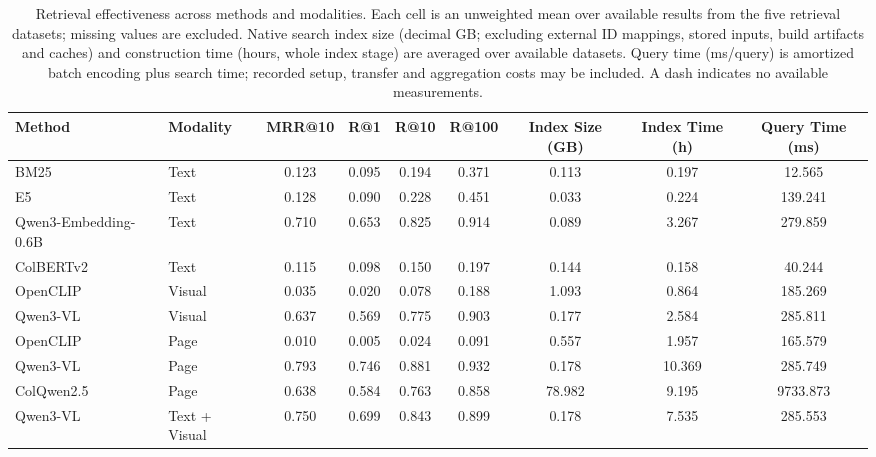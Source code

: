 \begin{table}[t]
\centering
\caption{Retrieval effectiveness across methods and modalities. Each cell is an unweighted mean over available results from the five retrieval datasets; missing values are excluded. Native search index size (decimal GB; excluding external ID mappings, stored inputs, build artifacts and caches) and construction time (hours, whole index stage) are averaged over available datasets. Query time (ms/query) is amortized batch encoding plus search time; recorded setup, transfer and aggregation costs may be included. A dash indicates no available measurements.}
\label{tab:retrieval_results}
\footnotesize
\setlength{\tabcolsep}{4pt}
\renewcommand{\arraystretch}{1.1}
\begin{tabular}{@{}llccccccc@{}}
\toprule
\textbf{Method} & \textbf{Modality} & \textbf{MRR@10} & \textbf{R@1} & \textbf{R@10} & \textbf{R@100} & \textbf{Index Size (GB)} & \textbf{Index Time (h)} & \textbf{Query Time (ms)} \\
\midrule
BM25 & Text & 0.123 & 0.095 & 0.194 & 0.371 & 0.113 & 0.197 & 12.565 \\
E5 & Text & 0.128 & 0.090 & 0.228 & 0.451 & 0.033 & 0.224 & 139.241 \\
Qwen3-Embedding-0.6B & Text & 0.710 & 0.653 & 0.825 & 0.914 & 0.089 & 3.267 & 279.859 \\
ColBERTv2 & Text & 0.115 & 0.098 & 0.150 & 0.197 & 0.144 & 0.158 & 40.244 \\
\midrule
OpenCLIP & Visual & 0.035 & 0.020 & 0.078 & 0.188 & 1.093 & 0.864 & 185.269 \\
Qwen3-VL & Visual & 0.637 & 0.569 & 0.775 & 0.903 & 0.177 & 2.584 & 285.811 \\
\midrule
OpenCLIP & Page & 0.010 & 0.005 & 0.024 & 0.091 & 0.557 & 1.957 & 165.579 \\
Qwen3-VL & Page & 0.793 & 0.746 & 0.881 & 0.932 & 0.178 & 10.369 & 285.749 \\
ColQwen2.5 & Page & 0.638 & 0.584 & 0.763 & 0.858 & 78.982 & 9.195 & 9733.873 \\
\midrule
Qwen3-VL & Text + Visual & 0.750 & 0.699 & 0.843 & 0.899 & 0.178 & 7.535 & 285.553 \\
\bottomrule
\end{tabular}
\end{table}
